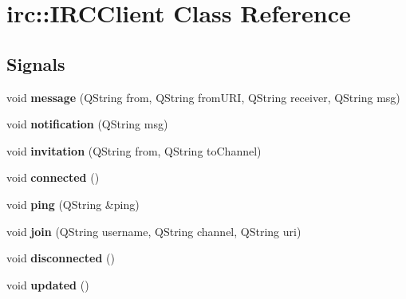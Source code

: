 \hypertarget{classirc_1_1IRCClient}{
\section{irc::IRCClient Class Reference}
\label{classirc_1_1IRCClient}
}
\subsection*{Signals}
\begin{DoxyCompactItemize}
\item 
\hypertarget{classirc_1_1IRCClient_a9e5b75e20a192457f4cdf819b294a8c3}{
void {\bfseries message} (QString from, QString fromURI, QString receiver, QString msg)}
\label{classirc_1_1IRCClient_a9e5b75e20a192457f4cdf819b294a8c3}

\item 
\hypertarget{classirc_1_1IRCClient_afe82b1dfb3e89b99a3113be1a1e03e09}{
void {\bfseries notification} (QString msg)}
\label{classirc_1_1IRCClient_afe82b1dfb3e89b99a3113be1a1e03e09}

\item 
\hypertarget{classirc_1_1IRCClient_a6eb42da585b279e552ed39841b7ae39c}{
void {\bfseries invitation} (QString from, QString toChannel)}
\label{classirc_1_1IRCClient_a6eb42da585b279e552ed39841b7ae39c}

\item 
\hypertarget{classirc_1_1IRCClient_a5ab1f6de72ef1092bbdbfd92e5c5847a}{
void {\bfseries connected} ()}
\label{classirc_1_1IRCClient_a5ab1f6de72ef1092bbdbfd92e5c5847a}

\item 
\hypertarget{classirc_1_1IRCClient_a404b289697f4d575269c43a809a70f2c}{
void {\bfseries ping} (QString \&ping)}
\label{classirc_1_1IRCClient_a404b289697f4d575269c43a809a70f2c}

\item 
\hypertarget{classirc_1_1IRCClient_ab3e54b5591cc81602ca89dfc974cb0d3}{
void {\bfseries join} (QString username, QString channel, QString uri)}
\label{classirc_1_1IRCClient_ab3e54b5591cc81602ca89dfc974cb0d3}

\item 
\hypertarget{classirc_1_1IRCClient_a8943fcd0e9d6a66312dfdea2aa16a48b}{
void {\bfseries disconnected} ()}
\label{classirc_1_1IRCClient_a8943fcd0e9d6a66312dfdea2aa16a48b}

\item 
\hypertarget{classirc_1_1IRCClient_adbc620ce9496313739ff917e896d3bc3}{
void {\bfseries updated} ()}
\label{classirc_1_1IRCClient_adbc620ce9496313739ff917e896d3bc3}

\end{DoxyCompactItemize}
